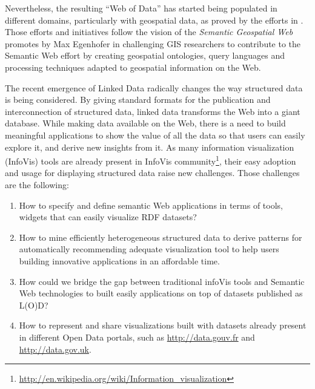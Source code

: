 Nevertheless, the resulting ``Web of Data'' has started being populated in different domains, particularly with geospatial data, as proved by the efforts in \cite{goodwin08,linkedgeodata,deLeon2010,Salas2011}. Those efforts and initiatives follow the vision of the \textit{Semantic Geospatial Web} promotes by Max Egenhofer in \cite{egenhofer12} challenging GIS researchers to contribute to the Semantic Web effort by creating geospatial ontologies, query languages and processing techniques adapted to geospatial information on the Web. 


The recent emergence of Linked Data radically changes the way structured data is being considered. By giving standard formats for the publication and interconnection of structured data, linked data transforms the Web into a giant database. While making data available on the Web, there is a need to build meaningful applications to show the value of all the data so that users can easily explore it, and derive new insights from it. As many information visualization (InfoVis) tools are already present in InfoVis community\footnote{\url{http://en.wikipedia.org/wiki/Information_visualization}}, their easy adoption and usage for displaying structured data raise new challenges. Those challenges are the following:
\begin{enumerate}
\item How to specify and define semantic Web applications in terms of tools, widgets that can easily visualize RDF datasets?
\item How to mine efficiently heterogeneous structured data to derive patterns for automatically recommending adequate visualization tool to help users building innovative applications in an affordable time.
\item How could we bridge the gap between traditional infoVis tools and Semantic Web technologies to built easily applications on top of datasets published as L(O)D?
\item How to represent and share visualizations built with datasets already present in different Open Data portals, such as \url{http://data.gouv.fr} and \url{http://data.gov.uk}.  
\end{enumerate}

  

